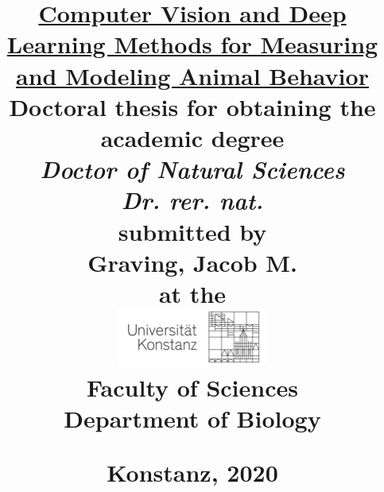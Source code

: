 \documentclass[11pt,a4paper,oneside,fullpage]{report} %
\title{
	\HUGE \ul{\textbf{Computer Vision and Deep Learning Methods for Measuring and Modeling Animal Behavior}} \\ %
	\vspace{2.5cm}
	\Large \textbf{Doctoral thesis for obtaining the} \\
	\Large \textbf{academic degree} \\
	\vspace{1cm}
	\Large \textit{Doctor of Natural Sciences} \\
	\Large \textit{Dr. rer. nat.} \\
	\vspace{2cm}
    \large submitted by \\
    \vspace{0.5cm}
    \Large Graving, Jacob M. \\
    \vspace{1cm}
    \large at the \\
    \vspace{1cm}
	\includegraphics[width=5cm]{graphics/uni_logo.png}\\
	\vspace{2cm}
	\Large Faculty of Sciences \\
	\vspace{0.5cm}
	\Large Department of Biology \\
    \vspace*{\fill}
    \date{}
	\begin{flushleft}
	    \large Konstanz, 2020
	\end{flushleft}
	\clearpage}
\def\blankpage{%
      \clearpage%
      \thispagestyle{empty}%
      \addtocounter{page}{-1}%
      \null%
      \clearpage}
\begin{document}
\maketitle
{} %
\setcounter{page}{1}
\tableofcontents

\begin{doublespace}
    
    
	\newpage
    
    \newpage 
    
    \newpage 
    
    \newpage 
    
    \newpage
    
    \begin{appendices}
        
        \newpage
        
    \end{appendices}
\end{doublespace} %

\nocite{*} %

\renewcommand{\bibname}{References}


\begin{doublespace}
    
    
\end{doublespace}
\end{document}
